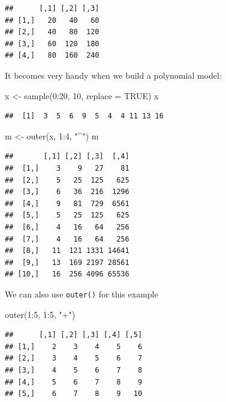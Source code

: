 \documentclass[
]{book}
\newenvironment{Shaded}{\begin{snugshade}}{\end{snugshade}}
\newcommand{\AttributeTok}[1]{\textcolor[rgb]{0.77,0.63,0.00}{#1}}
\newcommand{\ConstantTok}[1]{\textcolor[rgb]{0.00,0.00,0.00}{#1}}
\newcommand{\DecValTok}[1]{\textcolor[rgb]{0.00,0.00,0.81}{#1}}
\newcommand{\FunctionTok}[1]{\textcolor[rgb]{0.00,0.00,0.00}{#1}}
\newcommand{\NormalTok}[1]{#1}
\newcommand{\OtherTok}[1]{\textcolor[rgb]{0.56,0.35,0.01}{#1}}
\newcommand{\SpecialCharTok}[1]{\textcolor[rgb]{0.00,0.00,0.00}{#1}}
\newcommand{\StringTok}[1]{\textcolor[rgb]{0.31,0.60,0.02}{#1}}
\theoremstyle{definition}
\theoremstyle{definition}
\theoremstyle{definition}
\theoremstyle{definition}
\theoremstyle{remark}
\begin{document}
\begin{verbatim}
##      [,1] [,2] [,3]
## [1,]   20   40   60
## [2,]   40   80  120
## [3,]   60  120  180
## [4,]   80  160  240
\end{verbatim}

It becomes very handy when we build a polynomial model:

\begin{Shaded}
\begin{Highlighting}[]
\NormalTok{x }\OtherTok{\textless{}{-}} \FunctionTok{sample}\NormalTok{(}\DecValTok{0}\SpecialCharTok{:}\DecValTok{20}\NormalTok{, }\DecValTok{10}\NormalTok{, }\AttributeTok{replace =} \ConstantTok{TRUE}\NormalTok{)}
\NormalTok{x}
\end{Highlighting}
\end{Shaded}

\begin{verbatim}
##  [1]  3  5  6  9  5  4  4 11 13 16
\end{verbatim}

\begin{Shaded}
\begin{Highlighting}[]
\NormalTok{m }\OtherTok{\textless{}{-}} \FunctionTok{outer}\NormalTok{(x, }\DecValTok{1}\SpecialCharTok{:}\DecValTok{4}\NormalTok{, }\StringTok{"\^{}"}\NormalTok{)}
\NormalTok{m}
\end{Highlighting}
\end{Shaded}

\begin{verbatim}
##       [,1] [,2] [,3]  [,4]
##  [1,]    3    9   27    81
##  [2,]    5   25  125   625
##  [3,]    6   36  216  1296
##  [4,]    9   81  729  6561
##  [5,]    5   25  125   625
##  [6,]    4   16   64   256
##  [7,]    4   16   64   256
##  [8,]   11  121 1331 14641
##  [9,]   13  169 2197 28561
## [10,]   16  256 4096 65536
\end{verbatim}

We can also use \texttt{outer()} for this example

\begin{Shaded}
\begin{Highlighting}[]
\FunctionTok{outer}\NormalTok{(}\DecValTok{1}\SpecialCharTok{:}\DecValTok{5}\NormalTok{, }\DecValTok{1}\SpecialCharTok{:}\DecValTok{5}\NormalTok{, }\StringTok{"+"}\NormalTok{)}
\end{Highlighting}
\end{Shaded}

\begin{verbatim}
##      [,1] [,2] [,3] [,4] [,5]
## [1,]    2    3    4    5    6
## [2,]    3    4    5    6    7
## [3,]    4    5    6    7    8
## [4,]    5    6    7    8    9
## [5,]    6    7    8    9   10
\end{verbatim}
\end{document}
